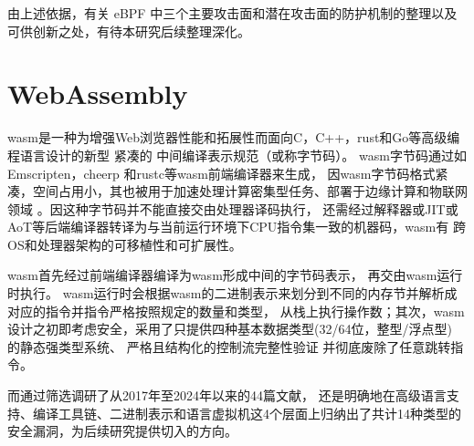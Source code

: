 \documentclass[12pt,a4paper,dvipdfmx]{article}
\begin{document}
\begin{sloppypar}
\begin{CJK*}{UTF8}{song}
	由上述依据，有关 eBPF 中三个主要攻击面和潜在攻击面的防护机制的整理以及可供创新之处，有待本研究后续整理深化。

	\section{WebAssembly}
	wasm是一种为增强Web浏览器性能和拓展性\cite{haasBringingWebSpeed2017}而面向C，C++，rust和Go等高级编程语言设计的新型
	紧凑的\cite{yanUnderstandingPerformanceWebassembly2021,titzerFastInplaceInterpreter2022,Daniel2019DiscoveringVI}
	中间编译表示规范\cite{wasmCommunityGroup,lehmannWasabiFrameworkDynamically2019,lehmannEverythingOldNew,
	bhansaliFirstLookCode2022,waseemIssuesTheirCauses2024}（或称字节码）。
	wasm字节码通过如Emscripten\cite{FrontEndCompileremscripten}，cheerp\cite{FrontEndCompilerCheerp}
	和rustc等wasm前端编译器来生成\cite{romanoEmpiricalStudyBugs2021}，
	因wasm字节码格式紧凑，空间占用小，其也被用于加速处理计算密集型任务\cite{caoWASMixerBinaryObfuscation2023}、部署于边缘计算和物联网领域
	\cite{rayOverviewWebAssemblyIoT2023}。因这种字节码并不能直接交由处理器译码执行，
	还需经过解释器或JIT或AoT等后端编译器转译为与当前运行环境下CPU指令集一致的机器码\cite[6]{zhangResearchWebAssemblyRuntimes2024}，wasm有
	跨OS和处理器架构的可移植性和可扩展性\cite{lehmannEverythingOldNew,waseemIssuesTheirCauses2024,
		lehmannWasabiFrameworkDynamically2019,JayProvablySafe,zhangResearchWebAssemblyRuntimes2024,rayOverviewWebAssemblyIoT2023}。

	wasm首先经过前端编译器编译为wasm形成中间的字节码表示，
	再交由wasm运行时执行\cite{zhangResearchWebAssemblyRuntimes2024}。
	wasm运行时会根据wasm的二进制表示来划分到不同的内存节并解析成对应的指令\cite{skanehiraWrittingWasmRuntime2024}并指令严格按照规定的数量和类型，
	从栈上执行操作数\cite{wasmcoretech}；其次，wasm设计之初即考虑安全\cite{wasmCommunityGroup}，采用了只提供四种基本数据类型(32/64位，整型/浮点型)
	的静态强类型系统\cite{wasmCommunityGroup,groupWebAssemblySpecification2024,WASMDYPA,haasBringingWebSpeed2017}、
	严格\cite{wasmIntelSGX}且结构化\cite{infoflowctrforwasm,lehmannEverythingOldNew}的控制流完整性验证
	并彻底废除了任意跳转指令\cite{wasmcoretech}。
	
	而\textcite{WebAssemblySummaryOnSecurity}通过筛选调研了从2017年至2024年以来的44篇文献，
	还是明确地在高级语言支持、编译工具链、二进制表示和语言虚拟机这4个层面上归纳出了共计14种类型的安全漏洞，为后续研究提供切入的方向。


\end{CJK*}
\end{sloppypar}
\end{document}
